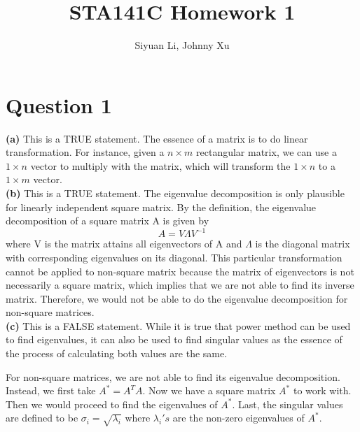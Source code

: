 \documentclass[12pt]{article}
\begin{document}
\title{STA141C Homework 1}
\author{Siyuan Li, Johnny Xu}
\maketitle

\section*{Question 1}
\textbf{(a)}
This is a TRUE statement. The essence of a matrix is to do linear transformation. For instance, given a $n \times m$ rectangular matrix, we can use a $1 \times n$ vector to multiply with the matrix, which will transform the $1 \times n$ to a $1 \times m$ vector. \\
\textbf{(b)}
This is a TRUE statement. The eigenvalue decomposition is only plausible for linearly independent square matrix. By the definition, the eigenvalue decomposition of a square matrix A is given by
$$A = V \Lambda V^{-1}$$
where V is the matrix attains all eigenvectors of A and $\Lambda$ is the diagonal matrix with corresponding eigenvalues on its diagonal. This particular transformation cannot be applied to non-square matrix because the matrix of eigenvectors is not necessarily a square matrix, which implies that we are not able to find its inverse matrix. Therefore, we would not be able to do the eigenvalue decomposition for non-square matrices. \\
\textbf{(c)}
This is a FALSE statement. While it is true that power method can be used to find eigenvalues, it can also be used to find singular values as the essence of the process of calculating both values are the same.

For non-square matrices, we are not able to find its eigenvalue decomposition. Instead, we first take $A^{*} = A^{T}A$. Now we have a square matrix $A^{*}$ to work with. Then we would proceed to find the eigenvalues of $A^{*}$. Last, the singular values are defined to be $\sigma_{i} = \sqrt{\lambda_{i}}$ where $\lambda_{i}'s$ are the non-zero eigenvalues of $A^{*}$. 
\end{document}
